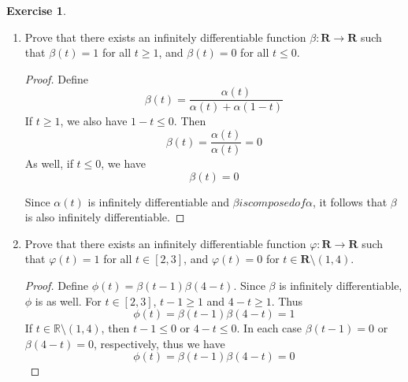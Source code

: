 \documentclass{article}
\newcommand{\R}{\mathbf{R}}
\theoremstyle{plain} %
\numberwithin{thm}{section} %
\theoremstyle{definition}
\newtheorem{exercise}[thm]{Exercise} %
\begin{document}
\begin{exercise}
\begin{enumerate}[label=(\alph*)]
\begin{proof}
            \end{proof}
    
            \item Prove that there exists an infinitely differentiable function $\beta:\R\rightarrow \R$ such that $\beta(t)=1$ for all $t\geq 1$, and $\beta(t)=0$ for all $t\leq 0$.
    
            \begin{proof}
                Define
                \[
                    \beta (t) = \frac{\alpha (t)}{\alpha (t) + \alpha (1-t)}
                \] 
                If \(t\geq 1\), we also have \(1-t \leq 0\). Then
                \[
                    \beta (t) = \frac{\alpha (t)}{\alpha (t)} = 0
                \]
                As well, if \(t \leq 0\), we have
                \[
                    \beta (t) = 0
                \]

                Since \(\alpha(t)\) is infinitely differentiable and \(\beta is composed of \alpha \), it follows that \(\beta\) is also infinitely differentiable.

            \end{proof}
    
            \item Prove that there exists an infinitely differentiable function $\varphi:\R\rightarrow \R$ such that $\varphi(t)=1$ for all $t\in [2,3]$, and $\varphi(t)=0$ for $t\in \R\setminus (1,4)$.
    
            \begin{proof}
                Define \(\phi (t) = \beta (t-1) \beta (4-t)\).
                Since \(\beta\) is infinitely differentiable, \(\phi\) is as well. For \(t \in [2,3]\), \(t-1 \geq 1\) and \(4-t \geq 1\). Thus
                \[
                    \phi (t) = \beta(t-1) \beta (4-t) = 1
                \]
                If \(t \in \mathbb{R} \setminus (1,4)\), then \(t-1 \leq 0\) or \(4-t \leq 0\). In each case \(\beta(t-1) = 0\) or \(\beta (4-t) = 0\), respectively, thus we have
                \[
                    \phi (t) = \beta (t-1) \beta (4-t) = 0
                \]
                
            \end{proof}
        \end{enumerate}
    \end{exercise}
\end{document}
